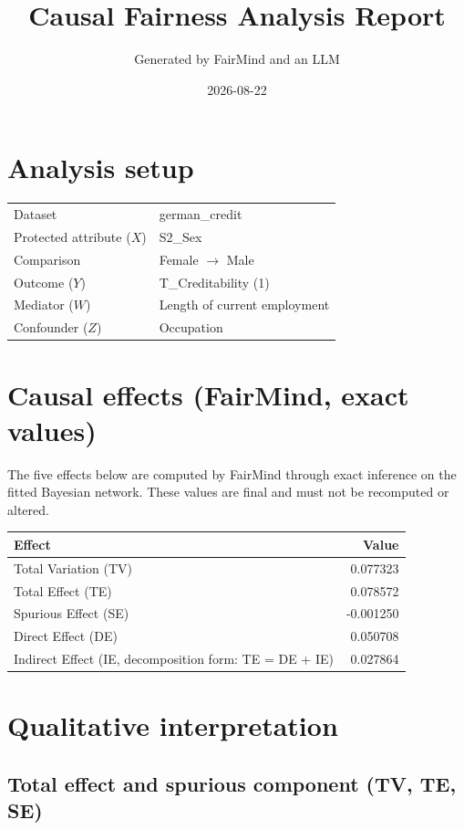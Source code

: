 \documentclass[11pt]{article}
\title{Causal Fairness Analysis Report}
\author{Generated by FairMind and an LLM}
\date{2026-08-22}
\begin{document}
\maketitle

\section{Analysis setup}

\begin{tabular}{ll}
\toprule
Dataset & german\_credit \\
Protected attribute ($X$) & S2\_Sex \\
Comparison & Female $\to$ Male \\
Outcome ($Y$) & T\_Creditability (1) \\
Mediator ($W$) & Length of current employment \\
Confounder ($Z$) & Occupation \\
\bottomrule
\end{tabular}

\section{Causal effects (FairMind, exact values)}

The five effects below are computed by FairMind through exact inference on the
fitted Bayesian network. These values are final and must not be recomputed or
altered.

\begin{tabular}{lr}
\toprule
Effect & Value \\
\midrule
Total Variation (TV) & 0.077323 \\
Total Effect (TE) & 0.078572 \\
Spurious Effect (SE) & -0.001250 \\
Direct Effect (DE) & 0.050708 \\
Indirect Effect (IE, decomposition form: TE = DE + IE) & 0.027864 \\
\bottomrule
\end{tabular}

\section{Qualitative interpretation}

\subsection{Total effect and spurious component (TV, TE, SE)}
\end{document}
